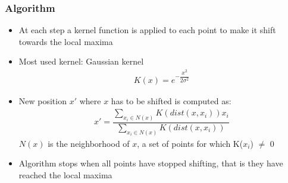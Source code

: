 \documentclass[xcolor=table]{beamer}
\begin{document}
\begin{frame}
\frametitle{Algorithm}
\begin{itemize}
\item At each step a kernel function is applied to each point to make it shift towards the local maxima
\vspace{0.15cm}
\item Most used kernel: Gaussian kernel 
\begin{align}
K(x) =  e^{-\dfrac{x^2}{2\sigma^2}}
\end{align}
\item New position $x'$ where $x$ has to be shifted is computed as:
\begin{align}
x' = \dfrac{\sum_{x_i \in N(x)} K(dist(x,x_i)) x_i}{\sum_{x_i \in N(x)} K(dist(x, x_i))}
\end{align}
$N(x)$ is the neighborhood of $x$, a set of points for which K($x_i$) $\neq$ 0
\vspace{0.25cm}
\item Algorithm stops when all points have stopped shifting, that is they have reached the local maxima
\end{itemize}

\end{frame}

\end{document}

